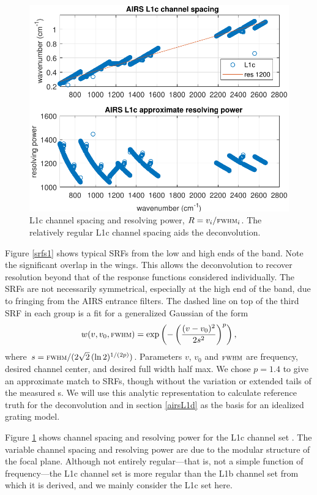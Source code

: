 \documentclass[journal]{IEEEtran}
\begin{document}
\begin{figure} %
  \centering
  \includegraphics[width=\linewidth]{figures/airs_L1c_res.pdf}
  \caption{{\airs} L1c channel spacing and resolving power, $R =
    v_i/\mbox{\small\textsc{fwhm}}_i$.  The relatively regular L1c channel spacing aids
    the deconvolution.}
  \label{chan1}
\end{figure}

Figure \ref{srfs1} shows typical {\airs} SRFs from the low and high
ends of the band.  Note the significant overlap in the wings.  This
allows the deconvolution to recover resolution beyond that of
the response functions considered individually.  The SRFs are not
necessarily symmetrical, especially at the high end of the band, due
to fringing from the AIRS entrance filters.  The dashed line on top of
the third SRF in each group is a fit for a generalized Gaussian
\cite{wiki:gauss} of the form
\[w(v, v_0, \mbox{\small\textsc{fwhm}}) = 
\exp\left(-\left(\frac{(v - v_0)^2}{2s^2}\right)^p\right), \] where
$s=\mbox{\small\textsc{fwhm}} / (2\sqrt{2}\,(\ln 2)^{1/(2p)})$.  Parameters $v$, $v_0$
and $\mbox{\small\textsc{fwhm}}$ are frequency, desired channel center, and desired full
width half max.  We chose $p = 1.4$ to give an approximate match to
{\airs} SRFs, though without the variation or extended tails of the
measured \srf s.  We will use this analytic representation to
calculate reference truth for the deconvolution and in section
\ref{airsL1d} as the basis for an idealized grating model.


Figure \ref{chan1} shows channel spacing and resolving power for the
{\airs} L1c channel set \cite{a1c:atbd}.  The variable channel
spacing and resolving power are due to the modular structure of the
focal plane.  Although not entirely regular---that is, not a simple
function of frequency---the L1c channel set is more regular than the
L1b channel set from which it is derived, and we mainly consider the
L1c set here.
\end{document}

